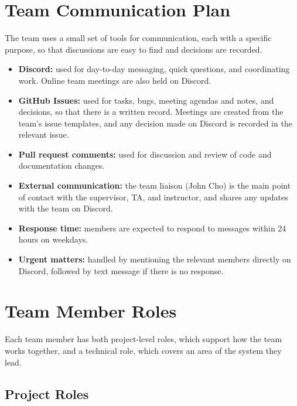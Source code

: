 \documentclass{article}
\begin{document}
\section{Team Communication Plan}

The team uses a small set of tools for communication, each with a specific
purpose, so that discussions are easy to find and decisions are recorded.

\begin{itemize}
  \item \textbf{Discord:} used for day-to-day messaging, quick questions, and
  coordinating work. Online team meetings are also held on Discord.
  \item \textbf{GitHub Issues:} used for tasks, bugs, meeting agendas and
  notes, and decisions, so that there is a written record. Meetings are
  created from the team's issue templates, and any decision made on Discord
  is recorded in the relevant issue.
  \item \textbf{Pull request comments:} used for discussion and review of
  code and documentation changes.
  \item \textbf{External communication:} the team liaison (John Cho) is the
  main point of contact with the supervisor, TA, and instructor, and shares
  any updates with the team on Discord.
  \item \textbf{Response time:} members are expected to respond to messages
  within 24 hours on weekdays.
  \item \textbf{Urgent matters:} handled by mentioning the relevant members
  directly on Discord, followed by text message if there is no response.
\end{itemize}

\section{Team Member Roles}

Each team member has both project-level roles, which support how the team
works together, and a technical role, which covers an area of the system
they lead.

\subsection{Project Roles}
\end{document}
